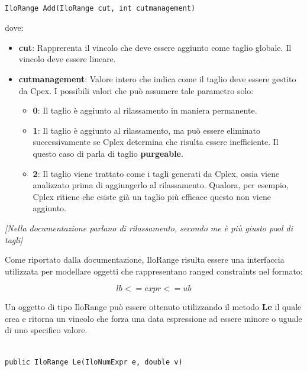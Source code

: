 \documentclass[11pt]{article}
\begin{document}
\begin{lstlisting}

IloRange Add(IloRange cut, int cutmanagement) 

\end{lstlisting}


dove:

\begin{itemize}
	\item \textbf{cut}: Rapprerenta il vincolo che deve essere aggiunto come taglio globale. Il vincolo deve essere lineare.
	\item \textbf{cutmanagement}: Valore intero che indica come il taglio deve essere gestito da Cpex. I possibili valori che può assumere tale parametro solo:
	
	\begin{itemize}
	\item \textbf{0}: Il taglio è aggiunto al rilassamento in maniera permanente.
	\item \textbf{1}: Il taglio è aggiunto al rilassamento, ma può essere eliminato successivamente se Cplex determina che risulta essere inefficiente. Il questo caso di 											parla di taglio \textbf{purgeable}. 
	\item \textbf{2}: Il taglio viene trattato come i tagli generati da Cplex, ossia viene analizzato prima di aggiungerlo al rilassamento.  Qualora, per esempio, Cplex ritiene che esiste 							già un taglio più efficace questo non viene aggiunto.	
	\end{itemize}

\end{itemize}

\textit{[Nella documentazione parlano di rilassamento, secondo me è più giusto pool di tagli]}

Come riportato dalla documentazione, IloRange risulta essere una interfaccia utilizzata per modellare oggetti che rappresentano ranged constraints nel formato:


$$lb <= expr <= ub$$ 


Un oggetto di tipo IloRange può essere ottenuto utilizzando il metodo \textbf{Le} il quale crea e ritorna un vincolo che forza una data espressione ad essere minore o uguale di uno specifico valore. 

\begin{lstlisting}

public IloRange Le(IloNumExpr e, double v)

\end{lstlisting}
\end{document}
